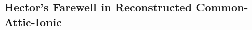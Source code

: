 \begin{appendixes}
    \section[Hector's Farewell]{Hector's Farewell in Reconstructed Common-Attic-Ionic}
        
\end{appendixes}